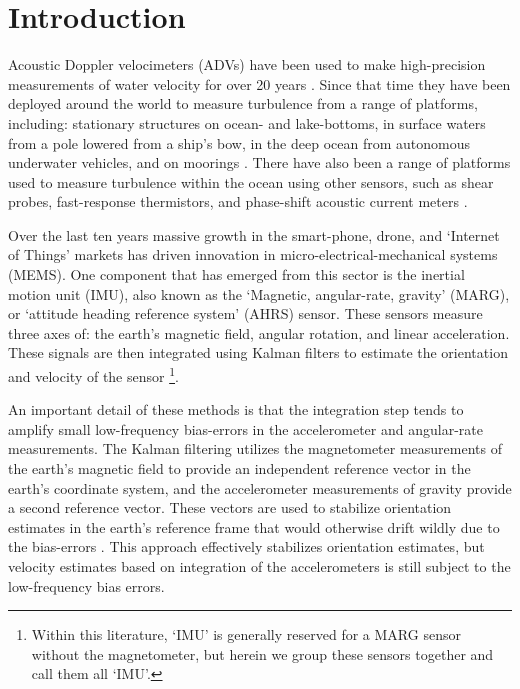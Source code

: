 
\section{Introduction}

Acoustic Doppler velocimeters (ADVs) have been used to make high-precision measurements of water velocity for over 20 years \citep[]{Kraus++1994,Lohrmann++1995}.  Since that time they have been deployed around the world to measure turbulence from a range of platforms, including: stationary structures on ocean- and lake-bottoms, in surface waters from a pole lowered from a ship's bow, in the deep ocean from autonomous underwater vehicles, and on moorings \cite[e.g.][]{Voulgaris+Trowbridge1998, Zhang++2001, Kim++2000, Goodman++2006, Lorke2007, Geyer++2008, Cartwright++2009, Fer+Paskyabi2014}. There have also been a range of platforms used to measure turbulence within the ocean using other sensors, such as shear probes, fast-response thermistors, and phase-shift acoustic current meters \citep[]{Doherty++1999, Lueck+Huang1999, Klymak++2003, Moum+Nash2009b, Alford2010}.


Over the last ten years massive growth in the smart-phone, drone, and `Internet of Things' markets has driven innovation in micro-electrical-mechanical systems (MEMS). One component that has emerged from this sector is the inertial motion unit (IMU), also known as the `Magnetic, angular-rate, gravity' (MARG), or `attitude heading reference system' (AHRS) sensor. These sensors measure three axes of: the earth's magnetic field, angular rotation, and linear acceleration. These signals are then integrated using Kalman filters to estimate the orientation and velocity of the sensor \cite[]{Barshan+Whyte1995, Marins++2001, Bachmann++2003}\footnote{Within this literature, `IMU' is generally reserved for a MARG sensor without the magnetometer, but herein we group these sensors together and call them all `IMU'.}. 

An important detail of these methods is that the integration step tends to amplify small low-frequency bias-errors in the accelerometer and angular-rate measurements. The Kalman filtering utilizes the magnetometer measurements of the earth's magnetic field to provide an independent reference vector in the earth's coordinate system, and the accelerometer measurements of gravity provide a second reference vector. These vectors are used to stabilize orientation estimates in the earth's reference frame that would otherwise drift wildly due to the bias-errors \cite[]{Haid+Breitenbach2004, Madgwick++2011}. This approach effectively stabilizes orientation estimates, but velocity estimates based on integration of the accelerometers is still subject to the low-frequency bias errors.

